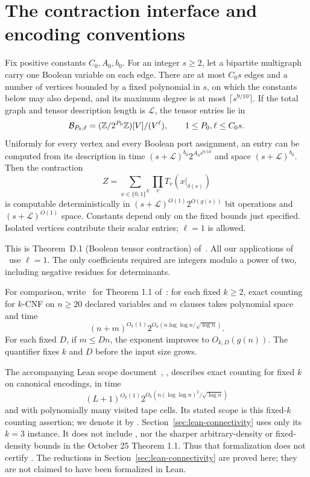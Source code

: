 \section{The contraction interface and encoding conventions}
\label{sec:interface}

\begin{hypothesis}
Fix positive constants $C_0,A_0,b_0$. For an integer $s\ge2$, let a
bipartite multigraph carry one Boolean variable on each edge. There
are at most $C_0s$ edges and a number of vertices bounded by a fixed
polynomial in $s$, on which the constants below may also depend, and its
maximum degree is at most $\lceil s^{9/10}\rceil$. If the total graph
and tensor description length is $\mathcal L$, the tensor entries lie
in
\[
 \mathcal B_{P_0,\ell}=(\mathbb Z/2^{P_0}\mathbb Z)[V]/(V^\ell),
 \qquad 1\le P_0,\ell\le C_0s.
\]
Uniformly for every vertex and every Boolean port assignment, an entry
can be computed from its description in time
$(s+\mathcal L)^{b_0}2^{A_0s^{9/10}}$ and space
$(s+\mathcal L)^{b_0}$. Then the contraction
\begin{equation}\label{eq:contraction}
 Z=\sum_{x\in\{0,1\}^{E}}\prod_v T_v(x|_{\delta(v)})
\end{equation}
is computable deterministically in
$(s+\mathcal L)^{O(1)}2^{O(g(s))}$ bit operations and
$(s+\mathcal L)^{O(1)}$ space. Constants depend only on the fixed
bounds just specified. Isolated vertices contribute their scalar
entries; $\ell=1$ is allowed.
\end{hypothesis}

This is Theorem~D.1 (Boolean tensor contraction) of~\cite{OpenAI26}.
All our applications of \HTC\ use $\ell=1$. The only
coefficients required are integers modulo a power of two, including
negative residues for determinants.

For comparison, write \HBB\ for Theorem 1.1 of~\cite{OpenAI26}:
for each fixed $k\ge2$, exact counting for $k$-CNF on $n\ge20$
declared variables and $m$ clauses takes polynomial space and time
\[
 (n+m)^{O_k(1)}
 2^{O_k(n\log\log n/\sqrt{\log n})}.
\]
For each fixed $D$, if $m\le Dn$, the exponent improves to
$O_{k,D}(g(n))$. The quantifier fixes $k$ and $D$ before the input
size grows.

The accompanying Lean scope document~\cite{OpenAILean26},
, describes exact counting for fixed $k$ on
canonical encodings, in time
\[
 (L+1)^{O_k(1)}
 2^{O_k(n(\log\log n)^2/\sqrt{\log n})}
\]
and with polynomially many visited tape cells. Its stated scope is
this fixed-$k$ counting assertion; we denote it by \HLean.
Section~\ref{sec:lean-connectivity} uses only its $k=3$ instance.
It does not include \HTC, nor the
sharper arbitrary-density or fixed-density bounds in the October 25
Theorem 1.1. Thus that formalization does not certify \HTC.
The reductions in Section~\ref{sec:lean-connectivity} are proved here;
they are not claimed to have been formalized in Lean.

